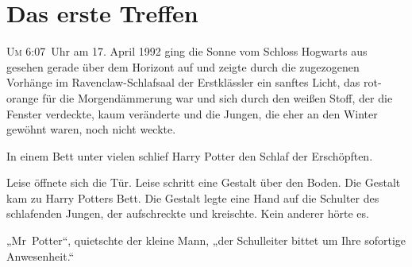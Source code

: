 
\section{Das erste Treffen}

\lettrine{U}{m} 6:07~Uhr am 17. April 1992 ging die Sonne vom Schloss Hogwarts aus gesehen gerade über dem Horizont auf und zeigte durch die zugezogenen Vorhänge im Ravenclaw-Schlafsaal der Erstklässler ein sanftes Licht, das rot-orange für die Morgendämmerung war und sich durch den weißen Stoff, der die Fenster verdeckte, kaum veränderte und die Jungen, die eher an den Winter gewöhnt waren, noch nicht weckte.

In einem Bett unter vielen schlief Harry Potter den Schlaf der Erschöpften.





Leise öffnete sich die Tür. Leise schritt eine Gestalt über den Boden. Die Gestalt kam zu Harry Potters Bett. Die Gestalt legte eine Hand auf die Schulter des schlafenden Jungen, der aufschreckte und kreischte. Kein anderer hörte es.

„Mr~Potter“, quietschte der kleine Mann, „der Schulleiter bittet um Ihre sofortige Anwesenheit.“

